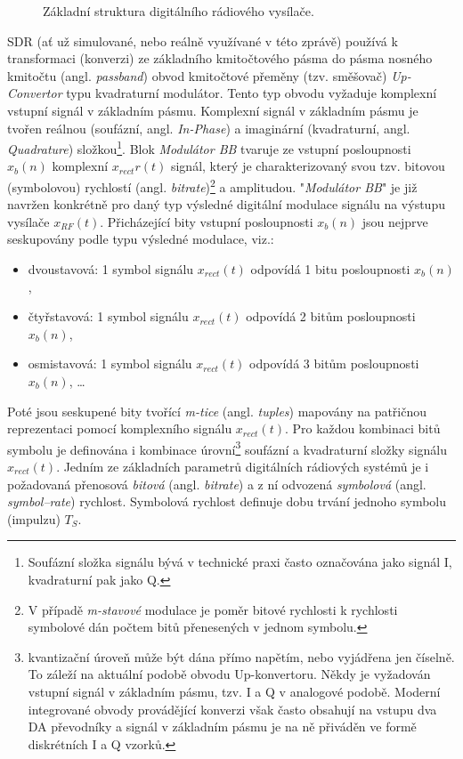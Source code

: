 \begin{figure}[ht]
 \begin{minipage}[c]{0.65\textwidth}
  
 \end{minipage}\hfill
 \begin{minipage}[t]{0.3\textwidth}
  \caption{Základní struktura digitálního rádiového vysílače.\label{fig_block_Tx}}
 \end{minipage}
\end{figure}

\marginpar{\textcolor{txt_blue}{Baseband modulace -- signál v základním pásmu}} 
 SDR (ať už simulované, nebo reálně využívané v této zprávě) používá k transformaci (konverzi) ze základního kmitočtového pásma do pásma nosného kmitočtu (angl. \textsl{passband}) obvod kmitočtové přeměny (tzv. směšovač) \textsl{Up-Convertor} typu kvadraturní modulátor. Tento typ obvodu vyžaduje komplexní vstupní signál v základním pásmu. Komplexní signál v základním pásmu je tvořen reálnou (soufázní, angl. \textsl{In-Phase}) a imaginární (kvadraturní, angl. \textsl{Quadrature}) složkou\footnote{Soufázní složka signálu bývá v technické praxi často označována jako signál I, kvadraturní pak jako Q.}. Blok \textsl{Modulátor BB} tvaruje ze vstupní posloupnosti $x_b(n)$ komplexní $x_{rect}r(t)$ signál, který je charakterizovaný svou tzv. bitovou (symbolovou) rychlostí (angl. \textsl{bitrate})\footnote{V případě \textsl{m-stavové} modulace je poměr bitové rychlosti k rychlosti symbolové dán počtem bitů přenesených v jednom symbolu.} a amplitudou. "\textsl{Modulátor BB}" je již navržen konkrétně pro daný typ výsledné digitální modulace signálu na výstupu vysílače $x_{RF}(t)$. Přicházející bity vstupní posloupnosti $x_b(n)$ jsou nejprve seskupovány podle typu výsledné modulace, viz.:

\begin{itemize}
\item dvoustavová: 1 symbol signálu $x_{rect}(t)$ odpovídá 1 bitu posloupnosti $x_b(n)$, 
\item čtyřstavová: 1 symbol signálu $x_{rect}(t)$ odpovídá 2 bitům posloupnosti $x_b(n)$,
\item osmistavová: 1 symbol signálu $x_{rect}(t)$ odpovídá 3 bitům posloupnosti $x_b(n)$, \ldots
\end{itemize}

Poté jsou seskupené bity tvořící \textsl{m-tice} (angl. \textsl{tuples}) mapovány na patřičnou reprezentaci pomocí komplexního signálu $x_{rect}(t)$. Pro každou kombinaci bitů symbolu je definována i kombinace úrovní\footnote{kvantizační úroveň může být dána přímo napětím, nebo vyjádřena jen číselně. To záleží na aktuální podobě obvodu Up-konvertoru. Někdy je vyžadován vstupní signál v základním pásmu, tzv. I a Q v analogové podobě. Moderní integrované obvody provádějící konverzi však často obsahují na vstupu dva DA převodníky a signál v základním pásmu je na ně přiváděn ve formě diskrétních I a Q vzorků.} soufázní a kvadraturní složky signálu $x_{rect}(t)$. Jedním ze základních parametrů digitálních rádiových systémů je i požadovaná přenosová \textsl{bitová} (angl. \textsl{bitrate}) a z ní odvozená \textsl{symbolová} (angl. \textsl{symbol--rate}) rychlost. Symbolová rychlost definuje dobu trvání jednoho symbolu (impulzu) $T_S$.

